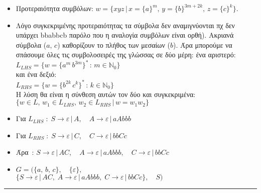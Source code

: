 \begin{tcolorbox}[colback=yellow!15!white, colframe=blue!50!white,
	fonttitle=\bfseries\Large, title = Απόδειξη με απόπειρα κατασκευής CFG]
\begin{itemize}
		\item Προτεραιότητα συμβόλων: $w= \{xyz \,\vert\, x = \{a\}^m,\, y = \{b\}^{3m+2k},\, z = \{c\}^k\}$.
\reducevspace\reducevspace\reducevspace\reducevspace\reducevspace
\reducevspace\reducevspace\reducevspace\reducevspace\reducevspace
		\item Λόγο συγκεκριμένης προτεραιότητας τα σύμβολα δεν αναμιγνύονται πχ δεν υπάρχει bbabbcb παρόλο που η αναλογία
		συμβόλων είναι ορθή). Ακριανά σύμβολα ($a,\,c$) καθορίζουν το πλήθος των μεσαίων ($b$). Άρα μπορούμε να σπάσουμε όλες
		τις συμβολοσειρές της γλώσσας σε δύο μέρη: ένα αριστερό:\\
		$L_{LHS} = \{w = \{a^m\, b^{3m}\}^* \,:\, m \in \mathbb{N}_0\}$\\
		και ένα δεξιό:\\
		$L_{RHS} = \{ w = \{b^{2k}\, c^k\}^* \,:\, k \in \mathbb{N}_0 \}$\\
		Η λύση θα είναι η σύνθεση αυτών τον δύο και συγκεκριμένα:\\
		$\{w \in L,\, w_1 \in L_{LHS},\, w_2 \in L_{RHS} \,\vert\, w = w_1 w_2\}$
\reducevspace\reducevspace\reducevspace\reducevspace\reducevspace
\reducevspace\reducevspace\reducevspace\reducevspace\reducevspace
		\item Για $L_{LHS} \;:\; S \rightarrow \varepsilon \,|\, A,\quad A \rightarrow \varepsilon \,|\, aAbbb $
\reducevspace\reducevspace\reducevspace\reducevspace\reducevspace
\reducevspace\reducevspace\reducevspace\reducevspace\reducevspace
		\item Για $L_{RHS} \;:\; S \rightarrow \varepsilon \,|\, C,\quad C \rightarrow \varepsilon \,|\, bbCc $
\reducevspace\reducevspace\reducevspace\reducevspace\reducevspace
\reducevspace\reducevspace\reducevspace\reducevspace\reducevspace
		\item Άρα $\,:\, S \rightarrow \varepsilon \,|\, AC,\quad A \rightarrow \varepsilon \,|\, aAbbb,\quad C
		\rightarrow \varepsilon \,|\, bbCc$
\reducevspace\reducevspace\reducevspace\reducevspace\reducevspace
\reducevspace\reducevspace\reducevspace\reducevspace\reducevspace
		\item $G = (\{a,\,b,\,c\},\quad \{\varepsilon\},$\\
		$\{S \rightarrow \varepsilon \,|\, AC,\; A \rightarrow \varepsilon \,|\, aAbbb,\; C \rightarrow \varepsilon
		\,|\, bbCc\},\quad S)$


	\end{itemize}
\end{tcolorbox}



\begin{center}
	\noindent\rule{\linewidth}{0.5pt}
\end{center}
\clearpage
